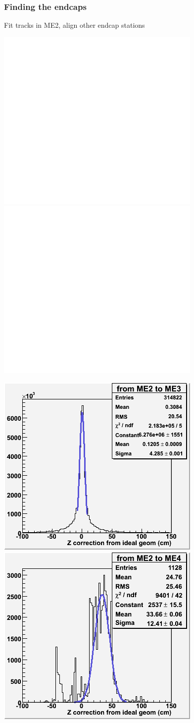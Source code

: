 \documentclass[compress]{beamer}
\begin{document}
\begin{frame}
\frametitle{Finding the endcaps}

Fit tracks in ME2, align other endcap stations

\includegraphics[width=0.4\linewidth]{blank.png}
\includegraphics[width=0.4\linewidth]{blank.png}

\includegraphics[width=0.4\linewidth]{hist_2and3.png}
\includegraphics[width=0.4\linewidth]{hist_2and4.png}

\end{frame}
\end{document}

